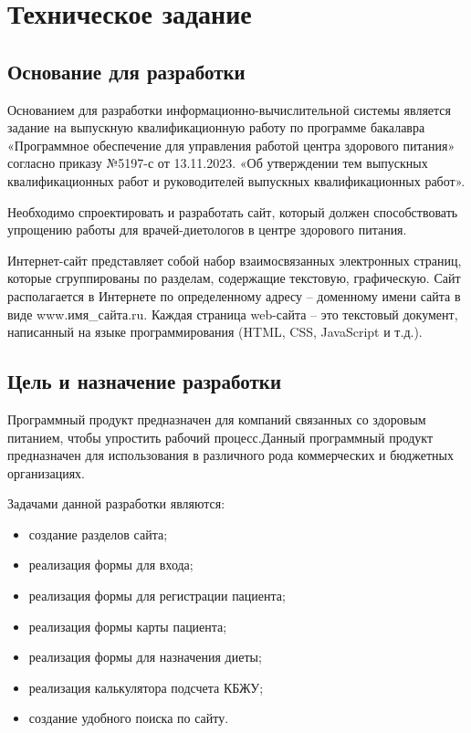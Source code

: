 \section{Техническое задание}
\subsection{Основание для разработки}

Основанием для разработки информационно-вычислительной системы является задание на выпускную квалификационную работу по программе бакалавра «Программное обеспечение для управления работой центра здорового питания» согласно приказу №5197-с от 13.11.2023. «Об утверждении тем выпускных квалификационных работ и руководителей выпускных квалификационных работ».

Необходимо спроектировать и разработать сайт, который должен способствовать упрощению работы для врачей-диетологов в центре здорового питания.

Интернет-сайт представляет собой набор взаимосвязанных электронных страниц, которые сгруппированы по разделам, содержащие текстовую, графическую. Сайт располагается в Интернете по определенному адресу – доменному имени сайта в виде www.имя\_сайта.ru. Каждая страница web-сайта – это текстовый документ, написанный на языке программирования (HTML, CSS, JavaScript и т.д.).

\subsection{Цель и назначение разработки}

Программный продукт предназначен для компаний связанных со здоровым питанием, чтобы упростить рабочий процесс.Данный программный продукт предназначен для использования в различного рода коммерческих и бюджетных организациях.

Задачами данной разработки являются:
\begin{itemize}
\item создание разделов сайта;
\item реализация формы для входа;
\item реализация формы для регистрации пациента;
\item реализация формы карты пациента;
\item реализация формы для назначения диеты;
\item реализация калькулятора подсчета КБЖУ;
\item создание удобного поиска по сайту.
\end{itemize}

